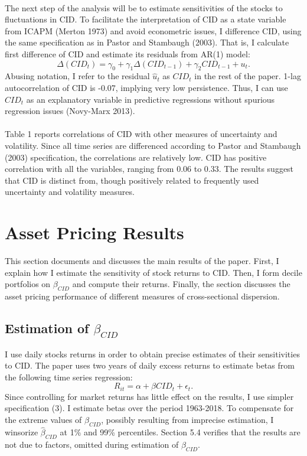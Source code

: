 \documentclass[12pt]{article}
\begin{document}
\paragraph{}
The next step of the analysis will be to estimate sensitivities of the stocks to fluctuations in CID. To facilitate the interpretation of CID as a state variable from ICAPM (Merton 1973) and avoid econometric issues, I difference CID, using the same specification as in Pastor and Stambaugh (2003). That is, I calculate first difference of CID and estimate its residuals from AR(1) model:
\begin{equation}
\Delta(CID_t) = \gamma_0 + \gamma_1 \Delta(CID_{t-1}) + \gamma_2 CID_{t-1} + u_t.
\end{equation}
Abusing notation, I refer to the residual $\hat{u}_t$ as $CID_t$ in the rest of the paper. 1-lag autocorrelation of CID is -0.07, implying very low persistence. Thus, I can use $CID_t$ as an explanatory variable in predictive regressions without spurious regression issues (Novy-Marx 2013). 
\paragraph{}
Table 1 reports correlations of CID with other measures of uncertainty and volatility. Since all time series are differenced according to Pastor and Stambaugh (2003) specification, the correlations are relatively low. CID has positive correlation with all the variables, ranging from 0.06 to 0.33. The results suggest that CID is distinct from, though positively related to frequently used uncertainty and volatility measures.

\section{Asset Pricing Results} \label{sec:Model}

This section documents and discusses the main results of the paper. First, I explain how I estimate the sensitivity of stock returns to CID. Then, I form decile portfolios on $\beta_{CID}$ and compute their returns. Finally, the section discusses the asset pricing performance of different measures of cross-sectional dispersion.

\subsection{Estimation of $\beta_{CID}$}
I use daily stocks returns in order to obtain precise estimates of their sensitivities to CID. The paper uses two years of daily excess returns to estimate betas from the following time series regression:
\begin{equation}
R_{it}=\alpha+\beta CID_t + \epsilon_t.
\end{equation}
Since controlling for market returns has little effect on the results, I use simpler specification (3). I estimate betas over the period 1963-2018. To compensate for the extreme values of $\hat{\beta}_{CID}$, possibly resulting from imprecise estimation, I winsorize $\hat{\beta}_{CID}$ at 1\% and 99\% percentiles. Section 5.4 verifies that the results are not due to factors, omitted during estimation of $\beta_{CID}$.  
\end{document}
